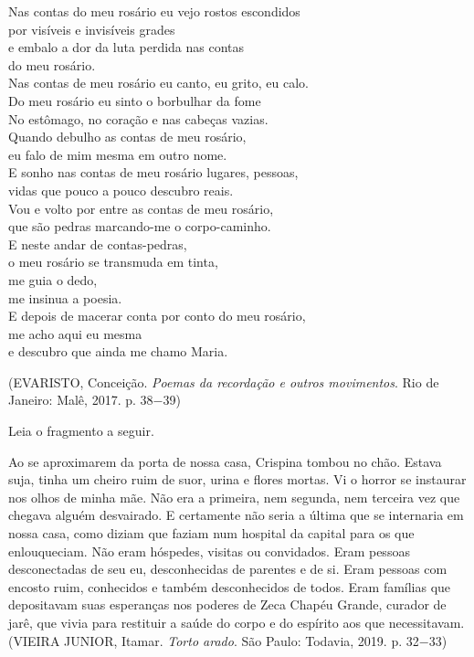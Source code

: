 \begin{minipage}[t]{0.49\linewidth}
Nas contas do meu rosário eu vejo rostos escondidos\\
por visíveis e invisíveis grades\\
e embalo a dor da luta perdida nas contas\\
do meu rosário.\\
Nas contas de meu rosário eu canto, eu grito, eu calo.\\
Do meu rosário eu sinto o borbulhar da fome\\
No estômago, no coração e nas cabeças vazias.\\
Quando debulho as contas de meu rosário,\\
eu falo de mim mesma em outro nome.\\
E sonho nas contas de meu rosário lugares, pessoas,\\
vidas que pouco a pouco descubro reais.\\
Vou e volto por entre as contas de meu rosário,\\
que são pedras marcando-me o corpo-caminho.\\
E neste andar de contas-pedras,\\
o meu rosário se transmuda em tinta,\\
me guia o dedo,\\
me insinua a poesia.\\
E depois de macerar conta por conto do meu rosário,\\
me acho aqui eu mesma\\
e descubro que ainda me chamo Maria.
\end{minipage}

\begin{center}(EVARISTO, Conceição. \textit{Poemas da recordação e outros movimentos}. Rio de Janeiro: Malê, 2017. p. 38−39)\end{center}

Leia o fragmento a seguir.

\par

Ao se aproximarem da porta de nossa casa, Crispina tombou no chão. Estava suja, tinha um cheiro ruim de suor, urina e flores mortas. Vi o horror se instaurar nos olhos de minha mãe. Não era a primeira, nem segunda, nem terceira vez que chegava alguém desvairado. E certamente não seria a última que se internaria em nossa casa, como diziam que faziam num hospital da capital para os que enlouqueciam. Não eram hóspedes, visitas ou convidados. Eram pessoas desconectadas de seu eu, desconhecidas de parentes e de si. Eram pessoas com encosto ruim, conhecidos e também desconhecidos de todos. Eram famílias que depositavam suas esperanças nos poderes de Zeca Chapéu Grande, curador de jarê, que vivia para restituir a saúde do corpo e do espírito aos que necessitavam. (VIEIRA JUNIOR, Itamar. \textit{Torto arado}. São Paulo: Todavia, 2019. p. 32−33)

